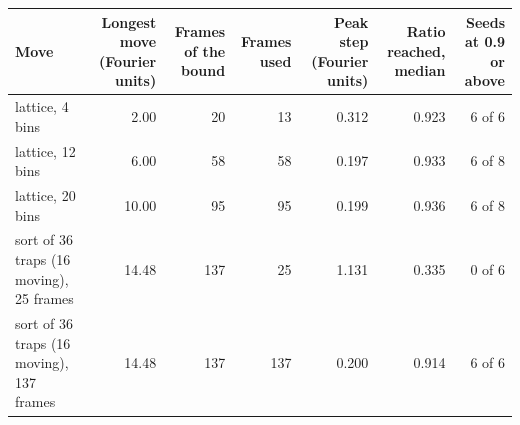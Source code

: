 \begin{tabular}{@{}l r r r r r r@{}}
\toprule
Move & Longest move (Fourier units) & Frames of the bound & Frames used & Peak step (Fourier units) & Ratio reached, median & Seeds at 0.9 or above \\
\midrule
lattice, 4 bins & 2.00 & 20 & 13 & 0.312 & 0.923 & 6 of 6 \\
lattice, 12 bins & 6.00 & 58 & 58 & 0.197 & 0.933 & 6 of 8 \\
lattice, 20 bins & 10.00 & 95 & 95 & 0.199 & 0.936 & 6 of 8 \\
sort of 36 traps (16 moving), 25 frames & 14.48 & 137 & 25 & 1.131 & 0.335 & 0 of 6 \\
sort of 36 traps (16 moving), 137 frames & 14.48 & 137 & 137 & 0.200 & 0.914 & 6 of 6 \\
\bottomrule
\end{tabular}
